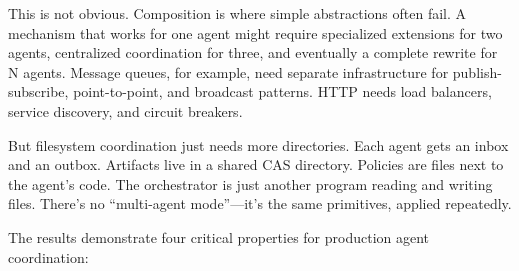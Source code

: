 \documentclass[11pt]{article}
\begin{document}
This is not obvious. Composition is where simple abstractions often fail. A mechanism that works for one agent might require specialized extensions for two agents, centralized coordination for three, and eventually a complete rewrite for N agents. Message queues, for example, need separate infrastructure for publish-subscribe, point-to-point, and broadcast patterns. HTTP needs load balancers, service discovery, and circuit breakers.

But filesystem coordination just needs more directories. Each agent gets an inbox and an outbox. Artifacts live in a shared CAS directory. Policies are files next to the agent's code. The orchestrator is just another program reading and writing files. There's no ``multi-agent mode''---it's the same primitives, applied repeatedly.

The results demonstrate four critical properties for production agent coordination:
\end{document}
